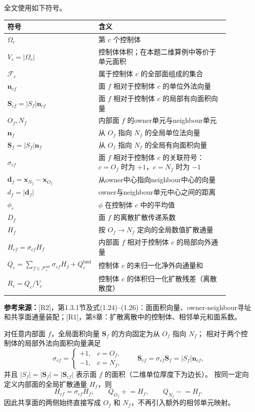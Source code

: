 \documentclass[UTF8,12pt,a4paper]{ctexart}
\numberwithin{equation}{section}
\newcommand{\Rone}{\textnormal{[R1]}}
\newcommand{\Rtwo}{\textnormal{[R2]}}
\newcommand{\source}[1]{%
  \par\smallskip
  \noindent\colorbox{sourcebg}{%
    \parbox{0.955\linewidth}{\raggedright\footnotesize\color{sourcegray}\textbf{参考来源：}#1}%
  }
  \par\smallskip
}
\newcommand{\Sf}{\bm S}
\newcommand{\xf}{\bm x}
\begin{document}
全文使用如下符号。
\begin{longtable}{>{\centering\arraybackslash}p{0.20\linewidth}p{0.69\linewidth}}
\toprule
符号 & 含义\\
\midrule
$\Omega_c$ & 第 $c$ 个控制体\\
$V_c=|\Omega_c|$ & 控制体体积；在本题二维算例中等价于单元面积\\
$\mathcal F_c$ & 属于控制体 $c$ 的全部面组成的集合\\
$\bm n_{cf}$ & 面 $f$ 相对于控制体 $c$ 的单位外法向量\\
$\Sf_{cf}=|S_f|\bm n_{cf}$ & 面 $f$ 相对于控制体 $c$ 的局部有向面积向量\\
$O_f,N_f$ & 内部面 $f$ 的owner单元与neighbour单元\\
$\bm n_f$ & 从 $O_f$ 指向 $N_f$ 的全局单位法向量\\
$\Sf_f=|S_f|\bm n_f$ & 从 $O_f$ 指向 $N_f$ 的全局有向面积向量\\
$\sigma_{cf}$ & 面 $f$ 相对于控制体 $c$ 的关联符号：$c=O_f$ 时为 $+1$，$c=N_f$ 时为 $-1$\\
$\bm d_f=\xf_{N_f}-\xf_{O_f}$ & 从owner中心指向neighbour中心的向量\\
$d_f=|\bm d_f|$ & owner与neighbour单元中心之间的距离\\
$\phi_c$ & $\phi$ 在控制体 $c$ 中的平均值\\
$D_f$ & 面 $f$ 的离散扩散传递系数\\
$H_f$ & 按 $O_f\to N_f$ 定向的全局数值扩散通量\\
$H_{cf}=\sigma_{cf}H_f$ & 内部面 $f$ 相对于控制体 $c$ 的局部向外通量\\
$Q_c=\sum_{f\in\mathcal F_c^{\mathrm{int}}}\sigma_{cf}H_f+Q_c^{\mathrm{bnd}}$ & 控制体 $c$ 的未归一化净外向通量和\\
$R_c=Q_c/V_c$ & 控制体 $c$ 的体积归一化扩散残差（离散散度）\\
\bottomrule
\end{longtable}

\source{\Rtwo，第1.3.1节及式(1.24)--(1.26)：面面积向量、owner-neighbour寻址和共享面通量装配；\Rone，第8章：扩散离散中的控制体、相邻单元和面系数。}

对任意内部面 $f$，全局面积向量 $\Sf_f$ 的方向固定为从 $O_f$ 指向 $N_f$；
相对于两个控制体的局部外法向面积向量满足
\begin{equation}
  \boxed{
  \sigma_{cf}=
  \begin{cases}
    +1,&c=O_f,\\
    -1,&c=N_f,
  \end{cases}
  \qquad
  \Sf_{cf}=\sigma_{cf}\Sf_f=|S_f|\bm n_{cf}},
  \label{eq:local_global_area_vectors}
\end{equation}
并且 $|S_f|=|\Sf_f|=|\Sf_{cf}|$ 表示面 $f$ 的面积（二维单位厚度下为边长）。
按同一定向定义内部面的全局扩散通量 $H_f$，则
\begin{equation}
  \boxed{
  H_{cf}=\sigma_{cf}H_f,
  \qquad
  Q_{O_f}\mathrel{+}=H_f,
  \qquad
  Q_{N_f}\mathrel{-}=H_f.}
  \label{eq:global_face_assembly}
\end{equation}
因此共享面的两侧始终直接写成 $O_f$ 和 $N_f$，不再引入额外的相邻单元映射。
\end{document}
